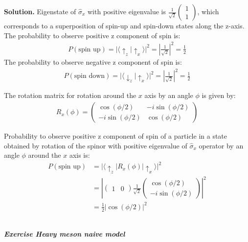 \documentclass[11pt,a4paper]{article}
\newcounter{zadanie}\newcommand{\zadanie}[1][]{\addtocounter{zadanie}{1} ~\\  {\bf \emph{Exercise \arabic{zadanie} #1 }} \\}
\newenvironment{solution}{\vspace{1cm} \par\textbf{Solution.} \vspace{1cm}}{\newpage}
\begin{document}
\begin{solution}
Eigenstate of $\hat{\sigma}_x$ with positive eigenvalue is 
$\frac{1}{\sqrt{2}}\begin{pmatrix} 1 \\ 1 \end{pmatrix}$, which corresponds 
to a superposition of spin-up and spin-down states along the z-axis.
The probability to observe positive z component of spin is:
\begin{align*}
  P(\text{spin up}) = \left| \langle \uparrow_z | \uparrow_x \rangle \right|^2 = \left| \frac{1}{\sqrt{2}} \right|^2 = \frac{1}{2}
\end{align*}
The probability to observe negative z component of spin is:
\begin{align*}
  P(\text{spin down}) = \left| \langle \downarrow_z | \uparrow_x \rangle \right|^2 = \left| \frac{
1}{\sqrt{2}} \right|^2 = \frac{1}{2}
\end{align*}

\vspace{0.2cm}

The rotation matrix for rotation around the $x$ axis by an angle $\phi$ is given by:
\begin{align*}
  R_x(\phi) = \begin{pmatrix} \cos(\phi/2) & -i\sin(\phi/2) \\ -i\sin(\phi/2) & \cos(\phi/2) \end{pmatrix}
\end{align*}

\vspace{0.2cm}

Probability to observe positive z component of spin of a particle in a state 
obtained by rotation of the spinor with positive eigenvalue of $\hat{\sigma}_x$ 
operator by an angle $\phi$ around the $x$ axis is:
\begin{align*}
  P(\text{spin up}) &= \left| \langle \uparrow_z | R_x(\phi) | \uparrow_x \rangle \right|^2 \\
  &= \left| \begin{pmatrix} 1 & 0 \end{pmatrix}
     \frac{1}{\sqrt{2}}
     \begin{pmatrix}
       \cos(\phi/2) \\
       -i\sin(\phi/2)
     \end{pmatrix}
     \right|^2 \\
  &= \frac{1}{2} \left| \cos(\phi/2) \right|^2 
\end{align*}

\end{solution}
\zadanie[Heavy meson naive model]
\end{document}
